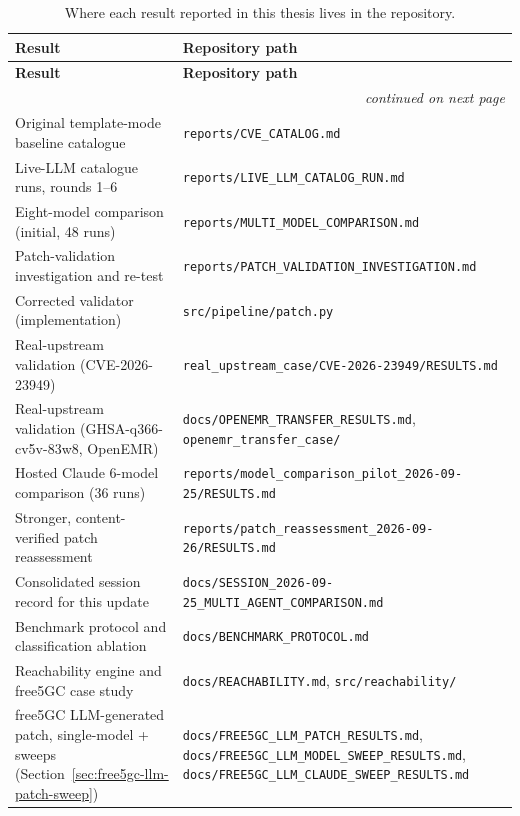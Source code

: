 \documentclass[12pt,a4paper]{report}
\begin{document}
\begin{longtable}{@{}p{6.5cm}p{6cm}@{}}
\caption{Where each result reported in this thesis lives in the repository.}
\label{tab:evidence-index} \\
\toprule
\textbf{Result} & \textbf{Repository path} \\
\midrule
\endfirsthead
\toprule
\textbf{Result} & \textbf{Repository path} \\
\midrule
\endhead
\midrule
\multicolumn{2}{r}{\footnotesize\emph{continued on next page}} \\
\endfoot
\bottomrule
\endlastfoot
Original template-mode baseline catalogue & \texttt{reports/\allowbreak CVE\_CATALOG.md} \\
Live-LLM catalogue runs, rounds 1--6 & \texttt{reports/\allowbreak LIVE\_LLM\_CATALOG\_RUN.md} \\
Eight-model comparison (initial, 48 runs) & \texttt{reports/\allowbreak MULTI\_MODEL\_COMPARISON.md} \\
Patch-validation investigation and re-test & \texttt{reports/\allowbreak PATCH\_VALIDATION\_\allowbreak INVESTIGATION.md} \\
Corrected validator (implementation) & \texttt{src/\allowbreak pipeline/\allowbreak patch.py} \\
Real-upstream validation (CVE-2026-23949) & \texttt{real\_upstream\_case/\allowbreak CVE-2026-23949/\allowbreak RESULTS.md} \\
Real-upstream validation (GHSA-q366-cv5v-83w8, OpenEMR) & \texttt{docs/\allowbreak OPENEMR\_TRANSFER\_RESULTS.md}, \texttt{openemr\_transfer\_case/} \\
Hosted Claude 6-model comparison (36 runs) & \texttt{reports/\allowbreak model\_comparison\_\allowbreak pilot\_2026-09-25/\allowbreak RESULTS.md} \\
Stronger, content-verified patch reassessment & \texttt{reports/\allowbreak patch\_reassessment\_2026-09-26/\allowbreak RESULTS.md} \\
Consolidated session record for this update & \texttt{docs/\allowbreak SESSION\_2026-09-25\_\allowbreak MULTI\_AGENT\_\allowbreak COMPARISON.md} \\
Benchmark protocol and classification ablation & \texttt{docs/\allowbreak BENCHMARK\_PROTOCOL.md} \\
Reachability engine and free5GC case study & \texttt{docs/\allowbreak REACHABILITY.md}, \texttt{src/\allowbreak reachability/} \\
free5GC LLM-generated patch, single-model + sweeps (Section~\ref{sec:free5gc-llm-patch-sweep}) & \texttt{docs/\allowbreak FREE5GC\_LLM\_PATCH\_RESULTS.md}, \texttt{docs/\allowbreak FREE5GC\_LLM\_MODEL\_SWEEP\_RESULTS.md}, \texttt{docs/\allowbreak FREE5GC\_LLM\_CLAUDE\_SWEEP\_RESULTS.md} \\

\end{longtable}
\end{document}
